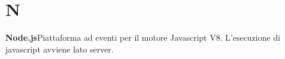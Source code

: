 \newpage
\section{N}\label{l:N}
\textbf{Node.js}\newline Piattaforma ad eventi per il motore Javascript V8. L'esecuzione di javascript avviene lato server.